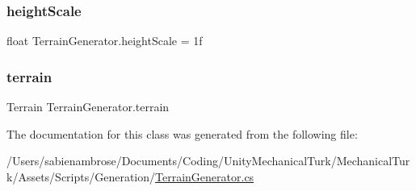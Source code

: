 \subsubsection{\texorpdfstring{height\+Scale}{heightScale}}
{\footnotesize\ttfamily float Terrain\+Generator.\+height\+Scale = 1f}

\mbox{\label{class_terrain_generator_a1f609c5d9b82c0976d0efb81120516ee}} 
\subsubsection{\texorpdfstring{terrain}{terrain}}
{\footnotesize\ttfamily Terrain Terrain\+Generator.\+terrain}



The documentation for this class was generated from the following file\+:\begin{DoxyCompactItemize}
\item 
/\+Users/sabienambrose/\+Documents/\+Coding/\+Unity\+Mechanical\+Turk/\+Mechanical\+Turk/\+Assets/\+Scripts/\+Generation/\mbox{\hyperlink{_terrain_generator_8cs}{Terrain\+Generator.\+cs}}\end{DoxyCompactItemize}
